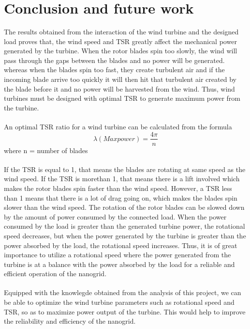 \documentclass[titlepage]{article}
\begin{document}
\section{Conclusion and future work}

\paragraph{}The results obtained from the interaction of the wind turbine and the designed load proves that, the wind speed and TSR greatly affect the mechanical power generated by the turbine. When the rotor blades spin too slowly, the wind will pass through the gaps between the blades and no power will be generated. whereas when the  blades spin too fast, they create turbulent air and if the incoming blade arrive too quickly it will then hit that turbulent air created by the blade before it and no power will be harvested from the wind. Thus, wind turbines must be designed with optimal TSR to generate maximum power from the turbine. 
\paragraph{} An optimal TSR ratio for a wind turbine can be calculated from the formula
\begin{equation}\label{}
\lambda(Max power) = \frac{4 \pi}{n} 
\end{equation}
where n = number of blades
\paragraph{} If the TSR is equal to 1, that means the blades are rotating at same speed as the wind speed. If the TSR is morethan 1, that means there is a lift involved which makes the rotor blades spin faster than the wind speed. However, a TSR less than 1 means that there is a lot of drag going on, which makes the blades spin slower than the wind speed. The rotation of the rotor blades can be slowed down by the amount of power consumed by the connected load. When the power consumed by the load is greater than the generated turbine power, the rotational speed decreases, but when the power generated by the turbine is greater than the power absorbed by the load, the rotational speed increases. Thus, it is of great importance to utilize a rotational speed where the power generated from the turbine is at a balance with the power absorbed by the load for a reliable and efficient operation of the nanogrid.

\paragraph{} Equipped with the knowlegde obtained from the analysis of this project, we can be able to optimize the wind turbine parameters such as rotational speed and TSR, so as to maximize power output of the turbine. This would help to improve the reliability and efficiency of the nanogrid. 
\end{document}
